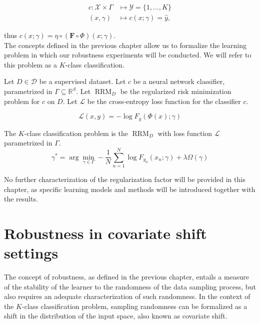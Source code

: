 $$
    \begin{aligned}
    c: \mathcal{X} \times \Gamma & \longmapsto \mathcal{Y} = \{1, \dots, K \} \\
    (x, \gamma) & \longmapsto c(x; \gamma) = \hat{y},
    \end{aligned}
$$

thus $c(x; \gamma) = \eta \circ (\bm{F} \circ \Phi)(x; \gamma)$. \\

The concepts defined in the previous chapter allow us to 
formalize the learning problem in which our robustness experiments
will be conducted. We will refer to this problem as a 
$K$-class classification.

\begin{definition}
    Let $D \in \mathcal{D}$ be a supervised dataset.
    Let $c$ be a neural network classifier, parametrized
    in $\Gamma \subseteq \mathbb{R}^{S}$.
    Let $\operatorname{RRM}_D$ be the regularized risk minimization problem for $c$ on $D$.
    Let $\mathcal{L}$ be the cross-entropy loss function for the classifier $c$.

    $$
    \mathcal{L}(x, y) = - \log F_y(\Phi(x); \gamma)
    $$

    The $K$-class classification problem is the $\operatorname{RRM}_D$ 
    with loss function $\mathcal{L}$ parametrized in $\Gamma$. 
    $$
        \gamma^* = \arg \min_{\gamma \in \Gamma} - \frac{1}{N}\sum_{n=1}^{N} \log F_{y_n}(x_n; \gamma) + \lambda \Omega(\gamma)
    $$

\end{definition}

No further characterization of the regularization factor will be provided
in this chapter, as specific learning models and methods will be introduced
together with the results.

\section{Robustness in covariate shift settings}\label{sec:robustness_to_covariate_shift}

The concept of robustness, as defined in the previous chapter, entails
a measure of the stability of the learner to the randomness of
the data sampling process, but also requires an adequate characterization
of such randomness. In the context of the $K$-class classification
problem, sampling randomness can be formalized as a shift in the
distribution of the input space, also known as covariate shift. 

